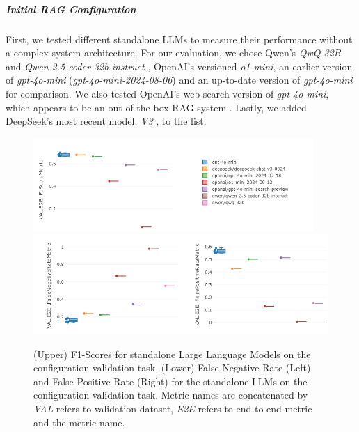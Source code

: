 \subparagraph{Initial RAG Configuration} 
First, we tested different standalone LLMs to measure their performance without a complex system architecture. For our evaluation, we chose Qwen's \textit{QwQ-32B} \cite{qwq32b} and \textit{Qwen-2.5-coder-32b-instruct} \cite{hui2024qwen2}\cite{qwen2}\cite{qwen2.5}, OpenAI's versioned \textit{o1-mini}, an earlier version of \textit{gpt-4o-mini} (\textit{gpt-4o-mini-2024-08-06}) and an up-to-date version of \textit{gpt-4o-mini} for comparison. We also tested OpenAI's web-search version of \textit{gpt-4o-mini}, which appears to be an out-of-the-box RAG system \cite{OpenAI_2022}. Lastly, we added DeepSeek's most recent model, \textit{V3} \cite{deepseekai2024deepseekv3technicalreport}, to the list. 

\begin{figure}[!ht]
    \centering
    \includegraphics[width=0.95\textwidth]{images/LLMStandalone-by-model.png}\\[6pt]
    \includegraphics[width=\textwidth]{images/LLMStandalone-by-model-FNRFPR.png}
    \caption{(Upper) F1-Scores for standalone Large Language Models on the configuration validation task. (Lower) False-Negative Rate (Left) and False-Positive Rate (Right) for the standalone LLMs on the configuration validation task. Metric names are concatenated by \textit{VAL} refers to validation dataset, \textit{E2E} refers to end-to-end metric and the metric name.}
    \label{fig:LLMStandalone-Results}
  \end{figure}

